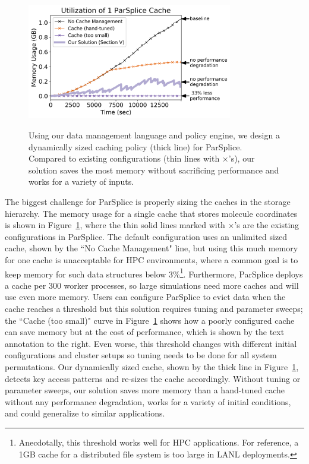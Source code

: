 \begin{figure}[t]
\centering
\includegraphics[width=0.8\textwidth]{./chapters/controlplane/parsplice/figures/cache-management.png}\\
\caption{Using our data management language and policy engine, we design a
dynamically sized caching policy (thick line) for ParSplice.  Compared to
existing configurations (thin lines with \(\times\)'s), our solution saves the most
memory without sacrificing performance and works for a variety of inputs.
\label{fig:cache-management}}
\end{figure}

The biggest challenge for ParSplice is properly sizing the caches in the
storage hierarchy.  The memory usage for a single cache that stores molecule
coordinates is shown in Figure~\ref{fig:cache-management}, where the thin solid
lines marked with \(\times\)'s are the existing configurations in ParSplice.
The default configuration uses an unlimited sized cache, shown by the ``No
Cache Management" line, but using this much memory for one cache is
unacceptable for HPC environments, where a common goal is to keep memory for
such data structures below 3\%\footnote{Anecdotally, this threshold works well
for HPC applications.  For reference, a 1GB cache for a distributed file system
is too large in LANL deployments.}. Furthermore, ParSplice deploys a cache per
300 worker processes, so large simulations need more caches and will use even
more memory.  Users can configure ParSplice to evict data when the cache
reaches a threshold but this solution requires tuning and parameter sweeps; the
``Cache (too small)" curve in Figure~\ref{fig:cache-management} shows how a
poorly configured cache can save memory but at the cost of performance, which
is shown by the text annotation to the right.  Even worse, this threshold
changes with different initial configurations and cluster setups so tuning
needs to be done for all system permutations.  Our dynamically sized cache,
shown by the thick line in Figure~\ref{fig:cache-management}, detects key
access patterns and re-sizes the cache accordingly.  Without tuning or
parameter sweeps, our solution saves more memory than a hand-tuned cache
without any performance degradation, works for a variety of initial conditions,
and could generalize to similar applications.

